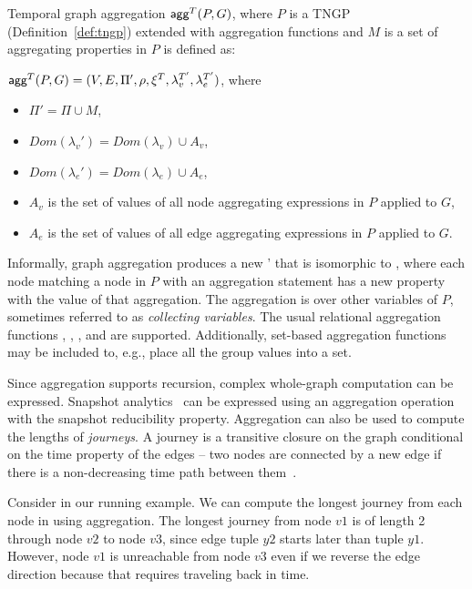 \begin{definition}[Aggregation]
\label{def:tgagg}
Temporal graph aggregation $\textsf{agg}^T(P,G)$, where $P$ is a TNGP (Definition~\ref{def:tngp}) extended with aggregation functions and $M$ is a set of aggregating properties in $P$ is defined as:

$\textsf{agg}^T(P,G) = (V,E,\Pi',\rho,\xi^T,\lambda^{T'}_v,\lambda^{T'}_e)$, where

\begin{itemize}[noitemsep,topsep=3pt,itemindent=\dimexpr{}+\relax,leftmargin=5pt]
\item $\Pi' = \Pi \cup M$,
\item $Dom(\lambda_v') = Dom(\lambda_v) \cup A_v$,
\item $Dom(\lambda_e') = Dom(\lambda_e) \cup A_e$,
\item $A_v$ is the set of values of all node aggregating expressions in $P$ applied to $G$,
\item $A_e$ is the set of values of all edge aggregating expressions in $P$ applied to $G$.
\end{itemize}
\end{definition}

Informally, graph aggregation produces a new \tg \tve' that is
isomorphic to \tve, where each node matching a node in $P$ with an
aggregation statement has a new property with the value of that
aggregation.  The aggregation is over other variables of $P$,
sometimes referred to as {\em collecting variables}.  The usual
relational aggregation functions , ,
, and  are supported.  Additionally, set-based
aggregation functions may be included to, e.g., place all the group
values into a set.

Since aggregation supports recursion, complex whole-graph computation
can be expressed.  Snapshot analytics~\cite{Labouseur2015,Miao2015}
can be expressed using an aggregation operation with the snapshot
reducibility property.  Aggregation can also be used to compute the
lengths of {\em journeys}.  A journey is a transitive closure on the
graph conditional on the time property of the edges -- two nodes are
connected by a new edge if there is a non-decreasing time path between
them~\cite{Casteigts2011}. %

\begin{example}
Consider \tg \ttt in our running example.  We can compute the longest
journey from each node in \ttt using aggregation.  The longest journey
from node $v1$ is of length 2 through node $v2$ to node $v3$, since
edge tuple $y2$ starts later than tuple $y1$.  However, node $v1$ is
unreachable from node $v3$ even if we reverse the edge direction because
that requires traveling back in time.
\end{example}

